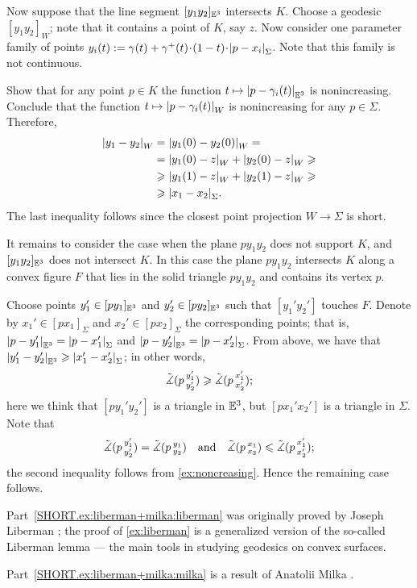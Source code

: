 Now suppose that the line segment $[y_1y_2]_{\mathbb{E}^3}$ intersects $K$.
Choose a geodesic $[y_1y_2]_W$;
note that it contains a point of $K$, say $z$.
Now consider one parameter family of points 
$y_i(t)\df \gamma(t)+\gamma^+(t)\cdot (1-t)\cdot \dist{p}{x_i}{\Sigma}$.
Note that this family is not continuous.

Show that for any point $p\in K$ the function $t\mapsto \dist{p}{\gamma_i(t)}{\EE^3}$ is nonincreasing.
Conclude that the function $t\mapsto \dist{p}{\gamma_i(t)}{W}$ is nonincreasing for any $p\in\Sigma$.
Therefore, 
\begin{align*}
\dist{y_1}{y_2}{W}
&=\dist{y_1(0)}{y_2(0)}{W}=
\\
&=\dist{y_1(0)}{z}{W}+\dist{y_2(0)}{z}{W}\ge
\\
&\ge\dist{y_1(1)}{z}{W}+\dist{y_2(1)}{z}{W}\ge 
\\
&\ge\dist{x_1}{x_2}{\Sigma}.
\end{align*}
The last inequality follows since the closest point projection $W\to\Sigma$ is short.

It remains to consider the case when the plane $py_1y_2$ does not support $K$,
and $[y_1y_2]_{\mathbb{E}^3}$ does not intersect $K$.
In this case the plane $py_1y_2$ intersects $K$ along a convex figure $F$ that lies in the solid triangle 
$py_1y_2$ and contains its vertex $p$.

Choose points $y_1'\in [py_1]_{\mathbb{E}^3}$ and $y_2'\in [py_2]_{\mathbb{E}^3}$ such that $[y_1'y_2']$ touches $F$.
Denote by $x_1'\in [px_1]_{\Sigma}$ and $x_2'\in [px_2]_{\Sigma}$ the corresponding points;
that is, $\dist{p}{y_1'}{\EE^3}=\dist{p}{x_1'}\Sigma$ and $\dist{p}{y_2'}{\EE^3}=\dist{p}{x_2'}\Sigma$.
From above, we have that $\dist{y_1'}{y_2'}{\EE^3}\ge\dist{x_1'}{x_2'}\Sigma$;
in other words, 
\[\tilde\measuredangle(p\,{}^{y_1'}_{y_2'})\geqslant \tilde\measuredangle(p\,{}^{x_1'}_{x_2'});\]
here we think that $[p{y_1'}{y_2'}]$ is a triangle in $\mathbb{E}^3$, but $[p{x_1'}{x_2'}]$ is a triangle in $\Sigma$.
Note that 
\[\tilde\measuredangle(p\,{}^{y_1'}_{y_2'})=\tilde\measuredangle(p\,{}^{y_1}_{y_2})
\quad\text{and}\quad
\tilde\measuredangle(p\,{}^{x_1}_{x_2})\leqslant \tilde\measuredangle(p\,{}^{x_1'}_{x_2'});
\]
the second inequality follows from \ref{ex:noncreasing}.
Hence the remaining case follows.

 Part~\ref{SHORT.ex:liberman+milka:liberman} was originally proved by Joseph Liberman \cite{liberman}; the proof of \ref{ex:liberman} is a generalized version of the so-called Liberman lemma --- the main tools in studying geodesics on convex surfaces.

Part~\ref{SHORT.ex:liberman+milka:milka} is a result of Anatolii Milka \cite[Theorem 2]{milka1982}.

